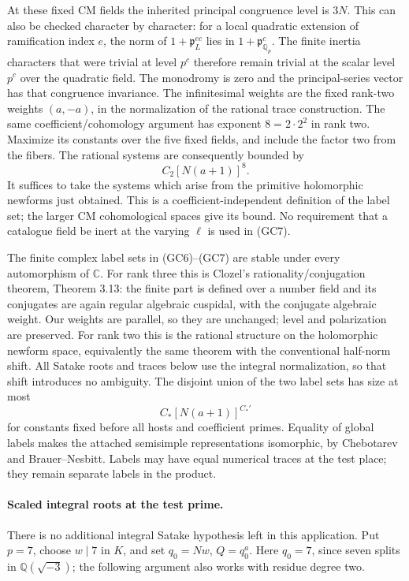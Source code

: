 At these fixed CM fields the inherited
principal congruence level is \(3N\).
This can also be checked character by
character: for a local quadratic extension
of ramification index \(e\), the norm of
\(1+\mathfrak p_L^{ec}\) lies in
\(1+\mathfrak p_{\mathbb Q_p}^{c}\).
The finite inertia characters that were
trivial at level \(p^c\) therefore remain
trivial at the scalar level \(p^c\) over
the quadratic field. The monodromy is
zero and the principal-series vector
has that congruence invariance.
The infinitesimal weights are the fixed
rank-two weights \((a,-a)\), in the
normalization of the rational trace
construction.
The same coefficient/cohomology argument
has exponent \(8=2\cdot2^2\) in rank two.
Maximize its constants over the five
fixed fields, and include the factor two
from the fibers. The rational systems
are consequently bounded by
\[
                            C_2[N(a+1)]^8.                \tag{GC7}
\]
It suffices to take the systems which
arise from the primitive holomorphic
newforms just obtained. This is a
coefficient-independent definition of
the label set; the larger CM
cohomological spaces give its bound.
No requirement that a catalogue field
be inert at the varying \(\ell\) is
used in (GC7).

The finite complex label sets in
(GC6)--(GC7) are stable under every
automorphism of \(\mathbb C\).
For rank three this is Clozel's
rationality/conjugation theorem,
Theorem 3.13: the finite part is defined
over a number field and its conjugates
are again regular algebraic cuspidal,
with the conjugate algebraic weight.
Our weights are parallel, so they are
unchanged; level and polarization are
preserved.
For rank two this is the rational
structure on the holomorphic newform
space, equivalently the same theorem
with the conventional half-norm shift.
All Satake roots and traces below use
the integral normalization, so that
shift introduces no ambiguity.
The disjoint union of the two label
sets has size at most
\[
                     C_*[N(a+1)]^{C_*'}                   \tag{GC8}
\]
for constants fixed before all hosts
and coefficient primes.
Equality of global labels makes the
attached semisimple representations
isomorphic, by Chebotarev and
Brauer--Nesbitt. Labels may have equal
numerical traces at the test place;
they remain separate labels in the product.

\paragraph{Scaled integral roots at the test prime.}
There is no additional integral Satake
hypothesis left in this application.
Put \(p=7\), choose \(w\mid7\) in \(K\),
and set \(q_0=Nw\), \(Q=q_0^a\).
Here \(q_0=7\), since seven splits in
\(\mathbb Q(\sqrt{-3})\); the following
argument also works with residue degree
two.

